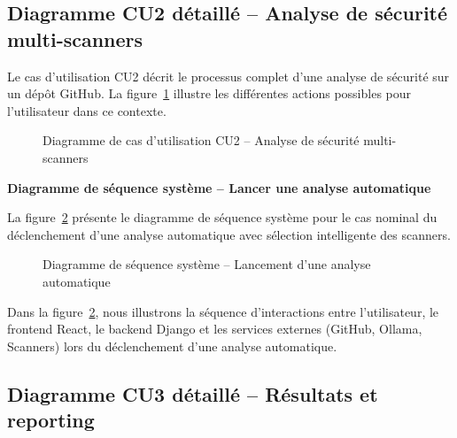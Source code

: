 \documentclass[12pt, a4paper, oneside]{report}
\begin{document}
\subsection{Diagramme CU2 détaillé -- Analyse de sécurité multi-scanners}
\label{subsec:uc2}

Le cas d'utilisation CU2 décrit le processus complet d'une analyse de sécurité
sur un dépôt GitHub. La figure~\ref{fig:uc2} illustre les différentes actions
possibles pour l'utilisateur dans ce contexte.

\begin{figure}[H]
    \centering
    \caption{Diagramme de cas d'utilisation CU2 -- Analyse de sécurité multi-scanners}
    \label{fig:uc2}
\end{figure}

\textbf{Diagramme de séquence système -- Lancer une analyse automatique}

La figure~\ref{fig:seq_autoscan} présente le diagramme de séquence système
pour le cas nominal du déclenchement d'une analyse automatique avec sélection
intelligente des scanners.

\begin{figure}[H]
    \centering
    \caption{Diagramme de séquence système -- Lancement d'une analyse automatique}
    \label{fig:seq_autoscan}
\end{figure}

Dans la figure~\ref{fig:seq_autoscan}, nous illustrons la séquence d'interactions
entre l'utilisateur, le frontend React, le backend Django et les services externes
(GitHub, Ollama, Scanners) lors du déclenchement d'une analyse automatique.

\subsection{Diagramme CU3 détaillé -- Résultats et reporting}
\label{subsec:uc3}
\end{document}
